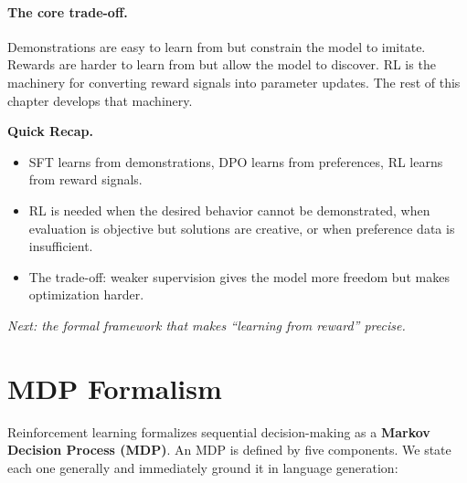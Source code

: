 \paragraph{The core trade-off.} Demonstrations are easy to learn from but constrain the model to imitate. Rewards are harder to learn from but allow the model to discover. RL is the machinery for converting reward signals into parameter updates. The rest of this chapter develops that machinery.

\begin{quickrecap}
\textbf{Quick Recap.}
\begin{itemize}[nosep,leftmargin=1.5em]
  \item SFT learns from demonstrations, DPO learns from preferences, RL learns from reward signals.
  \item RL is needed when the desired behavior cannot be demonstrated, when evaluation is objective but solutions are creative, or when preference data is insufficient.
  \item The trade-off: weaker supervision gives the model more freedom but makes optimization harder.
\end{itemize}
\textit{Next: the formal framework that makes ``learning from reward'' precise.}
\end{quickrecap}


\section{MDP Formalism}
\label{sec:mdp}

Reinforcement learning formalizes sequential decision-making as a \textbf{Markov Decision Process (MDP)}. An MDP is defined by five components. We state each one generally and immediately ground it in language generation:

